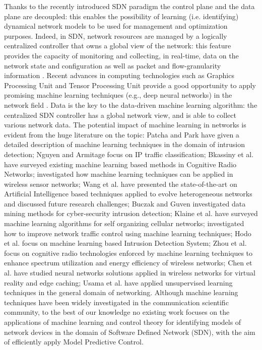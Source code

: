 Thanks to the recently introduced SDN paradigm \cite{Sezer2013,Kreutz2015, Jarschel2014, Chen2015, Ameigeiras2015} the control plane and the data plane are decoupled: this enables the possibility of learning (i.e. identifying) dynamical network models to be used for management and optimization purposes. Indeed, in SDN, network resources are managed by a logically centralized controller that owns a global view of the network: this feature provides the capacity of monitoring and collecting, in real-time, data on the network state and configuration as well as packet and flow-granularity information \cite{Amaral2016}. Recent advances in computing technologies such as Graphics Processing Unit and Tensor Processing Unit provide a good opportunity to apply promising machine learning techniques (e.g., deep neural networks) in the network field \cite{Wang2018, Usama2017}. Data is the key to the data-driven machine learning algorithm: the centralized SDN controller has a global network view, and is able to collect various network data. The potential impact of machine learning in networks is evident from the huge literature on the topic: Patcha and Park \cite{Patcha2007} have given a detailed description of machine learning techniques in the domain of intrusion detection; Nguyen and Armitage \cite{Nguyen2008} focus on IP traffic classification; Bkassiny et al. \cite{Bkassiny2013} have surveyed existing machine learning based methods in Cognitive Radio Networks; \cite{Alsheikh2014} investigated how machine learning techniques can be applied in wireless sensor networks; Wang et al. \cite{Wang2015} have presented the state-of-the-art on Artificial Intelligence based techniques applied to evolve heterogeneous networks and discussed future research challenges; Buczak and Guven \cite{Buczak2016} investigated data mining methods for cyber-security intrusion detection; Klaine et al. \cite{Klaine2017} have surveyed machine learning algorithms for self organizing cellular networks; \cite{Fadlullah2017} investigated how to improve network traffic control using machine learning techniques; Hodo et al. \cite{Hodo2017} focus on machine learning based Intrusion Detection System; Zhou et al. \cite{Zhou2017} focus on cognitive radio technologies enforced by machine learning techniques to enhance spectrum utilization and energy efficiency of wireless networks; Chen et al. \cite{Chen2017} have studied neural networks solutions applied in wireless networks for virtual reality and edge caching; Usama et al. \cite{Usama2017} have applied unsupervised learning techniques in the general domain of networking. Although machine learning techniques have been widely investigated in the communication scientific community, to the best of our knowledge no existing work focuses on the applications of machine learning and control theory for identifying models of network devices in the domain of Software Defined Network (SDN), with the aim of efficiently apply Model Predictive Control.

